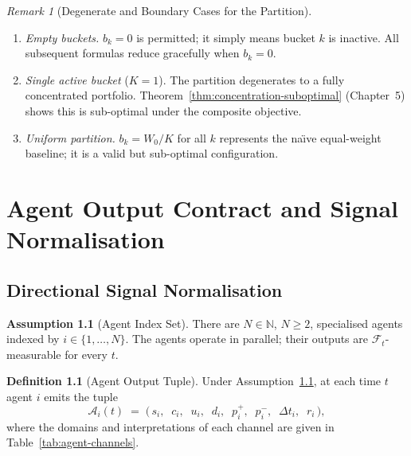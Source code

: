 \documentclass[12pt,openany]{book}
\newcommand{\calF}{\mathcal{F}}
\newcommand{\calA}{\mathcal{A}}
\numberwithin{equation}{chapter}
\theoremstyle{plain}
\theoremstyle{definition}
\newtheorem{definition}[theorem]{Definition}
\newtheorem{assumption}[theorem]{Assumption}
\theoremstyle{remark}
\newtheorem{remark}[theorem]{Remark}
\numberwithin{equation}{chapter}
\theoremstyle{plain}
\begin{document}
\begin{remark}[Degenerate and Boundary Cases for the Partition]
\label{rem:partition-edge}
\begin{enumerate}
  \item \emph{Empty buckets.}  $b_k = 0$ is permitted; it simply
        means bucket $k$ is inactive.  All subsequent formulas
        reduce gracefully when $b_k = 0$.
  \item \emph{Single active bucket} ($K=1$).  The partition
        degenerates to a fully concentrated portfolio.
        Theorem~\ref{thm:concentration-suboptimal} (Chapter~5)
        shows this is sub-optimal under the composite objective.
  \item \emph{Uniform partition.}  $b_k = W_0/K$ for all $k$
        represents the na\"{\i}ve equal-weight baseline; it
        is a valid but sub-optimal configuration.
\end{enumerate}
\end{remark}

\chapter{Agent Output Contract and Signal Normalisation}
\label{ch:agent-contract}

\section{Directional Signal Normalisation}

\begin{assumption}[Agent Index Set]
\label{asm:agent-index}
\label{asm:active-agent}
\label{asm:active-agents}
\label{asm:agent-outputs}
\label{asm:score-domain}
There are $N \in \mathbb{N}$, $N \geq 2$, specialised agents indexed
by $i \in \{1,\ldots,N\}$.  The agents operate in parallel; their
outputs are $\calF_t$-measurable for every $t$.
\end{assumption}

\begin{definition}[Agent Output Tuple]
\label{def:agent-output}
\label{def:agent-score}
Under Assumption~\ref{asm:agent-index}, at each time $t$ agent $i$
emits the tuple
\begin{equation}
  \calA_i(t)
  \;=\;
  \bigl(\,s_i,\;\; c_i,\;\; u_i,\;\; d_i,\;\;
         p_i^{+},\;\; p_i^{-},\;\; \Delta t_i,\;\; r_i\,\bigr),
  \label{eq:agent-tuple}
\end{equation}
where the domains and interpretations of each channel are given in
Table~\ref{tab:agent-channels}.
\end{definition}
\end{document}

